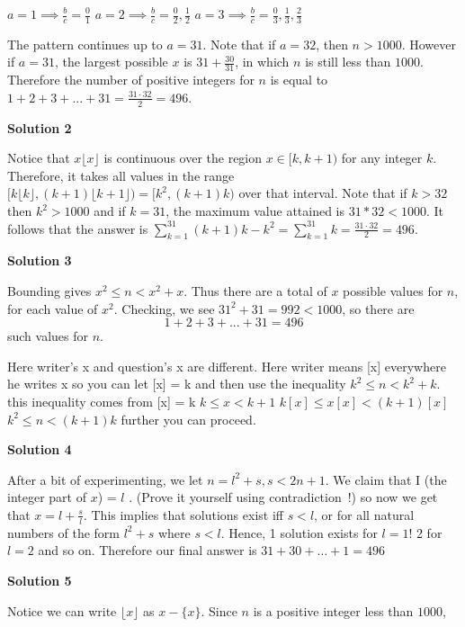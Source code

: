 \begin{enumerate}
 $a = 1 \implies \frac{b}{c} = \frac{0}{1}$
$a = 2 \implies \frac{b}{c} = \frac{0}{2},\frac{1}{2}$
$a = 3 \implies\frac{b}{c} =\frac{0}{3},\frac{1}{3},\frac{2}{3}$

 
The pattern continues up to $a = 31$. Note that if $a = 32$, then $n > 1000$. However if $a = 31$, the largest possible $x$ is $31 + \frac{30}{31}$, in which $n$ is still less than $1000$. Therefore the number of positive integers for $n$ is equal to $1+2+3+...+31 = \frac{31 \cdot 32}{2} = \boxed{496}.$




\textbf{Solution 2}

Notice that $x\lfloor x\rfloor$ is continuous over the region $x \in [k, k+1)$ for any integer $k$. Therefore, it takes all values in the range $[k\lfloor k\rfloor, (k+1)\lfloor k+1\rfloor) = [k^2, (k+1)k)$ over that interval. Note that if $k>32$ then $k^2 > 1000$ and if $k=31$, the maximum value attained is $31*32 < 1000$. It follows that the answer is $\sum_{k=1}^{31} (k+1)k-k^2  = \sum_{k=1}^{31} k = \frac{31\cdot 32}{2} = \boxed{496}.$




\textbf{Solution 3}

Bounding gives $x^2\le n<x^2+x$. Thus there are a total of $x$ possible values for $n$, for each value of $x^2$. Checking, we see $31^2+31=992<1000$, so there are 
 \[1+2+3+...+31= \boxed{496}\] such values for $n$.

 Here writer's x and question's x are different.
Here writer means [x] everywhere he writes x
so you can let [x] = k and then use the inequality $k^2\le n<k^2+k$.
this inequality comes from [x] = k
$k\le x<k+1$
$k[x]\le x[x]<(k+1)[x]$
$k^2\le n<(k+1)k$
 further you can proceed.

 



\textbf{Solution 4}

After a bit of experimenting, we let $n=l^2+s, s < 2n+1$. We claim that I (the integer part of $x$) = $l$ . (Prove it yourself using contradiction !) so now we get that $x=l+\frac{s}{l}$. This implies that solutions exist iff $s<l$, or for all natural numbers of the form $l^2+s$ where $s<l$. Hence, 1 solution exists for $l=1$! 2 for $l=2$ and so on. Therefore our final answer is $31+30+\dots+1= \boxed{496}$




\textbf{Solution 5}

Notice we can write $\lfloor x \rfloor$ as $x - \{x\}$. Since $n$ is a positive integer less than $1000$, 


\end{enumerate}

